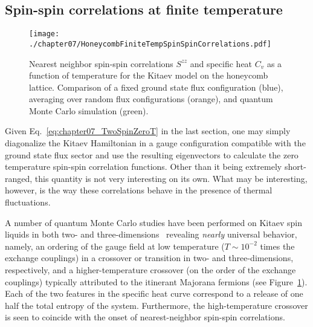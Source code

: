 \subsection{Spin-spin correlations at finite temperature}
\label{section:chapter07_SpinSpinCorrelationsFiniteTemperature}
%
%
%
\begin{figure}[tb]
	\centering
	\texttt{[image: ./chapter07/HoneycombFiniteTempSpinSpinCorrelations.pdf]}
	\caption{
		Nearest neighbor spin-spin correlations $S^{zz}$ and specific heat $C_v$ as a function of temperature for the Kitaev model on the honeycomb lattice.
		Comparison of a fixed ground state flux configuration (blue), averaging over random flux configurations (orange), and quantum Monte Carlo simulation (green).
	}
	\label{fig:chapter07_6_3SpinSpinCorrelations}
\end{figure}
%
Given Eq.~\eqref{eq:chapter07_TwoSpinZeroT} in the last section, one may simply diagonalize the Kitaev Hamiltonian in a gauge configuration compatible with the ground state flux sector and use the resulting eigenvectors to calculate the zero temperature spin-spin correlation functions.
Other than it being extremely short-ranged, this quantity is not very interesting on its own.
What may be interesting, however, is the way these correlations behave in the presence of thermal fluctuations.

A number of quantum Monte Carlo studies have been performed on Kitaev spin liquids in both two- and three-dimensions~\cite{NasuPRB2014,NasuPRL2014,NasuJoP2015,NasuPRB2015,NasuPRL2015,NasuJoP2016,MischenkoPRB2017,EschmannPRL2019} revealing \textit{nearly} universal behavior, namely, an ordering of the gauge field at low temperature ($T \sim 10^{-2}$ times the exchange couplings) in a crossover or transition in two- and three-dimensions, respectively, and a higher-temperature crossover (on the order of the exchange couplings) typically attributed to the itinerant Majorana fermions (see Figure~\ref{fig:chapter07_6_3SpinSpinCorrelations}).
Each of the two features in the specific heat curve correspond to a release of one half the total entropy of the system.
Furthermore, the high-temperature crossover is seen to coincide with the onset of nearest-neighbor spin-spin correlations.

